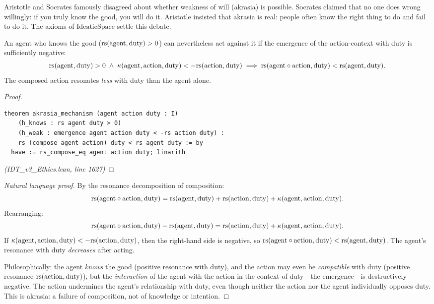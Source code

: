 Aristotle and Socrates famously disagreed about whether weakness of will
(akrasia) is possible. Socrates claimed that no one does wrong willingly:
if you truly know the good, you will do it. Aristotle insisted that
akrasia is real: people often know the right thing to do and fail to do it.
The axioms of $\mathrm{IdeaticSpace}$ settle this debate.

\begin{theorem}
\label{thm:akrasia-mechanism}
An agent who knows the good ($\mathrm{rs}(\mathrm{agent}, \mathrm{duty}) > 0$) can
nevertheless act against it if the emergence of the action-context with duty
is sufficiently negative:
\[
  \mathrm{rs}(\mathrm{agent}, \mathrm{duty}) > 0 \;\wedge\;
  \kappa(\mathrm{agent}, \mathrm{action}, \mathrm{duty}) < -\mathrm{rs}(\mathrm{action}, \mathrm{duty})
  \implies
  \mathrm{rs}(\mathrm{agent} \circ \mathrm{action}, \mathrm{duty}) < \mathrm{rs}(\mathrm{agent}, \mathrm{duty}).
\]
The composed action resonates \emph{less} with duty than the agent alone.
\end{theorem}

\begin{proof}
\begin{lstlisting}
theorem akrasia_mechanism (agent action duty : I)
    (h_knows : rs agent duty > 0)
    (h_weak : emergence agent action duty < -rs action duty) :
    rs (compose agent action) duty < rs agent duty := by
  have := rs_compose_eq agent action duty; linarith
\end{lstlisting}
\textit{(IDT\_v3\_Ethics.lean, line 1627)}
\end{proof}

\begin{proof}[Natural language proof]
By the resonance decomposition of composition:
\[
  \mathrm{rs}(\mathrm{agent} \circ \mathrm{action}, \mathrm{duty}) =
  \mathrm{rs}(\mathrm{agent}, \mathrm{duty}) + \mathrm{rs}(\mathrm{action}, \mathrm{duty})
  + \kappa(\mathrm{agent}, \mathrm{action}, \mathrm{duty}).
\]
Rearranging:
\[
  \mathrm{rs}(\mathrm{agent} \circ \mathrm{action}, \mathrm{duty}) - \mathrm{rs}(\mathrm{agent}, \mathrm{duty})
  = \mathrm{rs}(\mathrm{action}, \mathrm{duty}) + \kappa(\mathrm{agent}, \mathrm{action}, \mathrm{duty}).
\]
If $\kappa(\mathrm{agent}, \mathrm{action}, \mathrm{duty}) <
-\mathrm{rs}(\mathrm{action}, \mathrm{duty})$, then the right-hand side is negative,
so $\mathrm{rs}(\mathrm{agent} \circ \mathrm{action}, \mathrm{duty}) <
\mathrm{rs}(\mathrm{agent}, \mathrm{duty})$. The agent's resonance with duty
\emph{decreases} after acting.

Philosophically: the agent \emph{knows} the good (positive resonance with
duty), and the action may even be \emph{compatible} with duty (positive
resonance $\mathrm{rs}(\mathrm{action}, \mathrm{duty})$), but the \emph{interaction}
of the agent with the action in the context of duty---the emergence---is
destructively negative. The action undermines the agent's relationship with
duty, even though neither the action nor the agent individually opposes duty.
This is akrasia: a failure of composition, not of knowledge or intention.
\end{proof}

